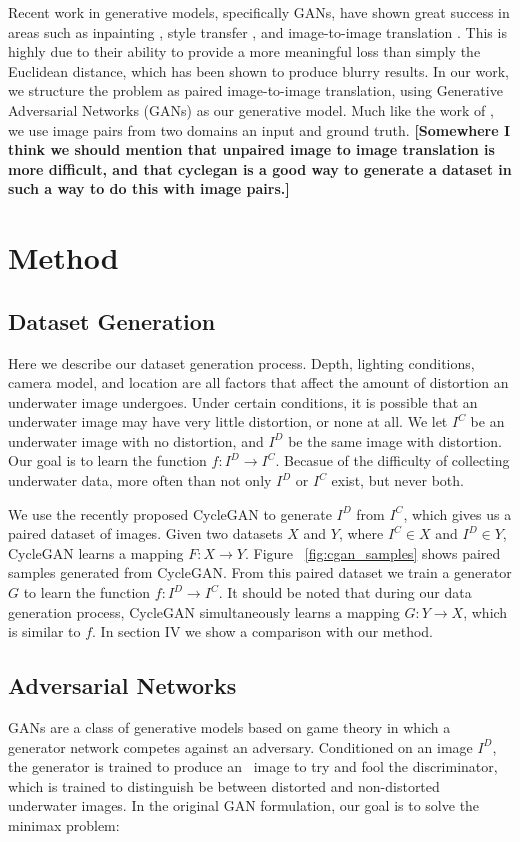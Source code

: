 \documentclass[letterpaper, 10pt, conference]{ieeeconf}
\newcommand{\marginlabel}[1]{\mbox{}\marginpar[\raggedleft\hspace{0pt}{#1}]{
\raggedright\hspace{0pt}{#1}}}
\newcommand{\starnote}[1]{\marginlabel{$\bigstar$}\textbf{[#1]}}
\begin{document}
Recent work in generative models, specifically GANs, have shown great success
in areas such as inpainting \cite{pathak2016context}, style transfer \cite{Gatys_2016_CVPR}, and image-to-image
translation \cite{isola2016image,zhu2017unpaired}. This is highly due to their ability to provide a more meaningful
loss than simply the Euclidean distance, which has been shown to produce blurry results. In our work, we structure
the problem as paired image-to-image translation, using Generative Adversarial Networks (GANs) as our generative model.
Much like the work of \cite{isola2016image}, we use image pairs from two domains an input and ground truth.
\starnote{Somewhere I think we should mention that unpaired image to image translation is more difficult, and
that cyclegan is a good way to generate a dataset in such a way to do this with image pairs.}

\section{Method}

\subsection{Dataset Generation}
Here we describe our dataset generation process. Depth, lighting conditions, camera
model, and location are all factors that affect the amount of distortion an underwater image undergoes. Under certain
conditions, it is possible that an underwater image may have very little distortion, or none at all.
We let $I^C$ be an underwater image with no distortion, and $I^D$
be the same image with distortion. Our goal is to learn the function $f: I^D \rightarrow I^C$. Becasue of the
difficulty of collecting underwater data, more often than not only $I^D$ or $I^C$ exist, but never both.

We use the recently proposed CycleGAN \cite{zhu2017unpaired} to generate $I^D$ from $I^C$, which gives us a paired
dataset of images. Given two datasets $X$ and $Y$, where $I^C \in X$ and $I^D \in Y$, CycleGAN learns a mapping
$F: X \rightarrow Y$. Figure ~\ref{fig:cgan_samples} shows paired samples generated from CycleGAN. From this paired dataset we train a
generator $G$ to learn the function $f: I^D \rightarrow I^C$. It should be noted that during our data generation process,
CycleGAN simultaneously learns a mapping $G: Y \rightarrow X$, which is similar to $f$. In section IV we show a comparison with our method.

\subsection{Adversarial Networks}
GANs \cite{goodfellow2014generative} are a class of generative models based on game theory in which a generator
network competes against an adversary. Conditioned on an image $I^D$, the generator is trained to produce an \
image to try and fool the discriminator, which is trained to distinguish be between distorted and non-distorted
underwater images. In the original GAN formulation, our goal is to solve the minimax problem:
\end{document}
